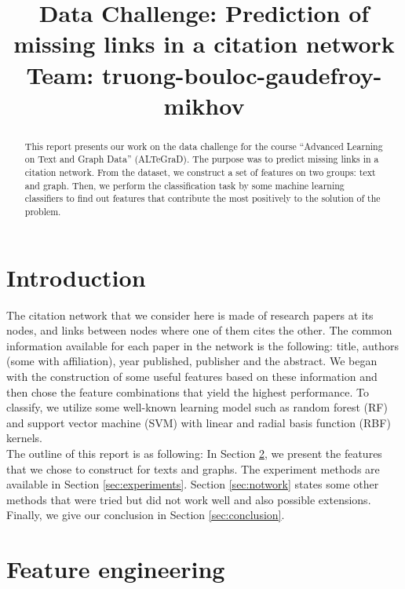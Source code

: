 \documentclass{article}
\title{Data Challenge: Prediction of missing links in a citation network\\Team: truong-bouloc-gaudefroy-mikhov}
\begin{document}
\ninept

\maketitle

\begin{abstract}
This report presents our work on the data challenge for the course \enquote{Advanced Learning on Text and Graph Data} (ALTeGraD). The purpose was to predict missing links in a citation network. From the dataset, we construct a set of features on two groups: text and graph. Then, we perform the classification task by some machine learning classifiers to find out features that contribute the most positively to the solution of the problem.
\end{abstract}


\section{Introduction}

The citation network that we consider here is made of research papers at its nodes, and links between nodes where one of them cites the other. The common information available for each paper in the network is the following: title, authors (some with affiliation), year published, publisher and the abstract. We began with the construction of some useful features based on these information and then chose the feature combinations that yield the highest performance. To classify, we utilize some well-known learning model such as random forest (RF) and support vector machine (SVM) with linear and radial basis function (RBF) kernels.\\
The outline of this report is as following: In Section \ref{sec:feature}, we present the features that we chose to construct for texts and graphs. The experiment methods are available in Section \ref{sec:experiments}. Section \ref{sec:notwork} states some other methods that were tried but did not work well and also possible extensions. Finally, we give our conclusion in Section \ref{sec:conclusion}.

\section{Feature engineering}
\label{sec:feature}
\end{document}
